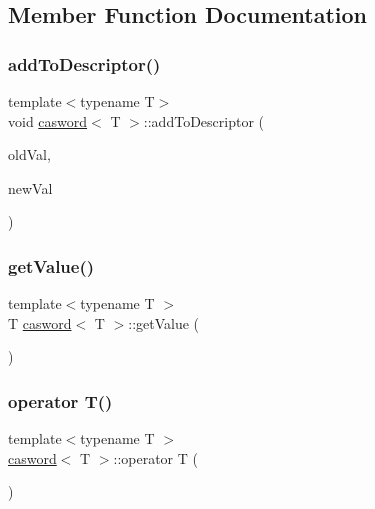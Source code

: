 \subsection{Member Function Documentation}
\mbox{\label{structcasword_ae9521db09e9366bb31156bc78830b760}} 
\subsubsection{\texorpdfstring{add\+To\+Descriptor()}{addToDescriptor()}}
{\footnotesize\ttfamily template$<$typename T$>$ \\
void \hyperlink{structcasword}{casword}$<$ T $>$\+::add\+To\+Descriptor (\begin{DoxyParamCaption}\item[{T}]{old\+Val,  }\item[{T}]{new\+Val }\end{DoxyParamCaption})}

\mbox{\label{structcasword_a815838a9e00061deaef7e5596bb5e8bf}} 
\subsubsection{\texorpdfstring{get\+Value()}{getValue()}}
{\footnotesize\ttfamily template$<$typename T $>$ \\
T \hyperlink{structcasword}{casword}$<$ T $>$\+::get\+Value (\begin{DoxyParamCaption}{ }\end{DoxyParamCaption})}

\mbox{\label{structcasword_a5b967f1ba3c54143e7ff37870831cf43}} 
\subsubsection{\texorpdfstring{operator T()}{operator T()}}
{\footnotesize\ttfamily template$<$typename T $>$ \\
\hyperlink{structcasword}{casword}$<$ T $>$\+::operator T (\begin{DoxyParamCaption}{ }\end{DoxyParamCaption})}

